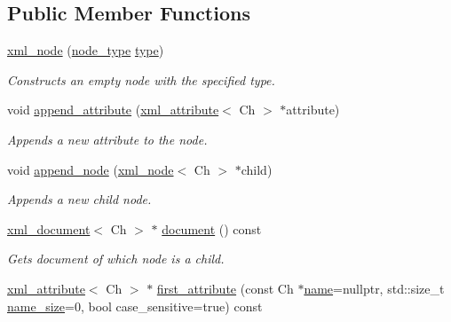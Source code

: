 \subsection*{Public Member Functions}
\begin{DoxyCompactItemize}
\item 
\mbox{\hyperlink{classrapidxml_1_1xml__node_a34c55af3504549a475e5b9dfcaa6adf5}{xml\+\_\+node}} (\mbox{\hyperlink{namespacerapidxml_a6a276b85e2da28c5f9c3dbce61c55682}{node\+\_\+type}} \mbox{\hyperlink{classrapidxml_1_1xml__node_a026a603e420a2e3e7ab820cfbd1a7e97}{type}})
\begin{DoxyCompactList}\small\item\em Constructs an empty node with the specified type. \end{DoxyCompactList}\item 
void \mbox{\hyperlink{classrapidxml_1_1xml__node_a8fbd4f5ef7169d493da9f8d87ac04b77}{append\+\_\+attribute}} (\mbox{\hyperlink{classrapidxml_1_1xml__attribute}{xml\+\_\+attribute}}$<$ Ch $>$ $\ast$attribute)
\begin{DoxyCompactList}\small\item\em Appends a new attribute to the node. \end{DoxyCompactList}\item 
void \mbox{\hyperlink{classrapidxml_1_1xml__node_a86de2e22276826089b7baed2599f8dee}{append\+\_\+node}} (\mbox{\hyperlink{classrapidxml_1_1xml__node}{xml\+\_\+node}}$<$ Ch $>$ $\ast$child)
\begin{DoxyCompactList}\small\item\em Appends a new child node. \end{DoxyCompactList}\item 
\mbox{\hyperlink{classrapidxml_1_1xml__document}{xml\+\_\+document}}$<$ Ch $>$ $\ast$ \mbox{\hyperlink{classrapidxml_1_1xml__node_ae5396d92d09394b37838f2518f430da4}{document}} () const
\begin{DoxyCompactList}\small\item\em Gets document of which node is a child. \end{DoxyCompactList}\item 
\mbox{\hyperlink{classrapidxml_1_1xml__attribute}{xml\+\_\+attribute}}$<$ Ch $>$ $\ast$ \mbox{\hyperlink{classrapidxml_1_1xml__node_a3cbbee0d76d96c3315cc9d80d169c8d9}{first\+\_\+attribute}} (const Ch $\ast$\mbox{\hyperlink{classrapidxml_1_1xml__base_af8436e9ee14c127220113eaa956eafee}{name}}=nullptr, std\+::size\+\_\+t \mbox{\hyperlink{classrapidxml_1_1xml__base_ad01e2eff02202b130baad012d1ed7328}{name\+\_\+size}}=0, bool case\+\_\+sensitive=true) const

\end{DoxyCompactItemize}
